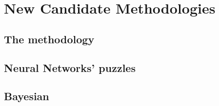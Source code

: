
\chapter{New Candidate Methodologies}
\label{ch:gp}
\minitoc
\adjustmtc



\section[The NNPDF methodology]{The \nnpdf methodology}
\label{sec:gp/nnpdf}


\section{Neural Networks' puzzles}
\label{sec:gp/issues}


\section{Bayesian \pdfs}
\label{sec:gp/bayes}

